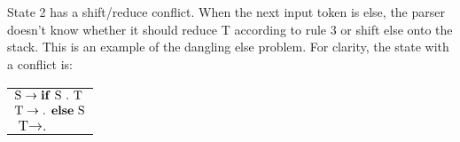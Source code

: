 \documentclass{article}
\begin{document}
\section{}

State 2 has a shift/reduce conflict. When the next input token is else, the parser doesn't know whether it should reduce T according to rule 3 or shift else onto the stack. This is an example of the dangling else problem. For clarity, the state with a conflict is: \\

\begin{tabular}{| l |}
  \hline
  $\text{S} \rightarrow \text{\textbf{if} S . T}$  \\
  $\text{T} \rightarrow \text{. \textbf{else} S}$  \\
  $\text{T} \rightarrow \text{.}$  \\
  \hline
\end{tabular}
\end{document}
